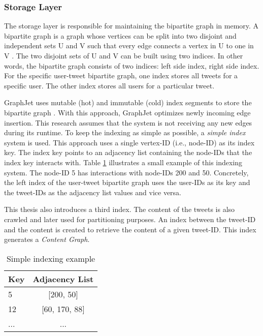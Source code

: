 
\subsubsection{Storage Layer}
\label{subsub:storage-index-layer}
The storage layer is responsible for maintaining the bipartite graph in memory. A bipartite graph is a graph whose vertices can be split into two disjoint and independent sets U and V such that every edge connects a vertex in U to one in V \cite{skienaImplementingDiscreteMathematics1991}. The two disjoint sets of U and V can be built using two indices. In other words, the bipartite graph consists of two indices: left side index, right side index. For the specific user-tweet bipartite graph, one index stores all tweets for a specific user. The other index stores all users for a particular tweet.


GraphJet uses mutable (hot) and immutable (cold) index segments to store the bipartite graph \cite{sharmaGraphJetRealtimeContent2016}. With this approach, GraphJet optimizes newly incoming edge insertion. This research assumes that the system is not receiving any new edges during its runtime. To keep the indexing as simple as possible, a \emph{simple index} system is used. This approach uses a single vertex-ID (i.e., node-ID) as its index key. The index key points to an adjacency list containing the node-IDs that the index key interacts with. Table \ref{tab:simple-indexing} illustrates a small example of this indexing system. The node-ID 5 has interactions with node-IDs 200 and 50. Concretely, the left index of the user-tweet bipartite graph uses the user-IDs as its key and the tweet-IDs as the adjacency list values and vice versa.


This thesis also introduces a third index. The content of the tweets is also crawled and later used for partitioning purposes. An index between the tweet-ID and the content is created to retrieve the content of a given tweet-ID. This index generates a \emph{Content Graph}.

\begin{table}[!ht]
    \centering
    \caption{Simple indexing example}
    \label{tab:simple-indexing}
    \begin{tabular}{|l|c|}
        \hline
        \textbf{Key} & \textbf{Adjacency List} \\
        \hline
        5 & [200, 50] \\
        \hline
        12 & [60, 170, 88] \\
        \hline
        ... & ... \\
        \hline
    \end{tabular}
\end{table}


